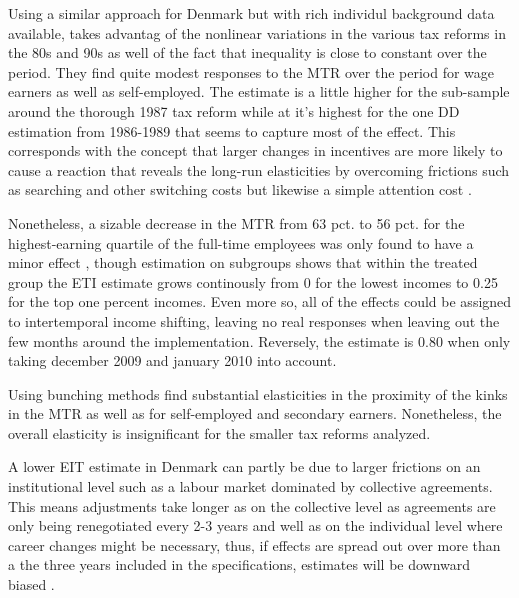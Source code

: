 Using a similar approach for Denmark but with rich individul background data available, \citet{kleven2014estimating} takes advantag of the nonlinear variations in the various tax reforms in the 80s and 90s as well of the fact that inequality is close to constant over the period. They find quite modest responses to the MTR over the period for wage earners as well as self-employed. The estimate is a little higher for the sub-sample around the thorough 1987 tax reform while at it's highest for the one DD estimation from 1986-1989 that seems to capture most of the effect. This corresponds with the concept that larger changes in incentives are more likely to cause a reaction that reveals the long-run elasticities by overcoming frictions such as searching and other switching costs but likewise a simple attention cost \citep{chetty2012bounds}.

Nonetheless, a sizable decrease in the MTR from 63 pct. to 56 pct. for the highest-earning quartile of the full-time employees was only found to have a minor effect \citep{kreiner2016tax}, though estimation on subgroups shows that within the treated group the ETI estimate grows continously from 0 for the lowest incomes to 0.25 for the top one percent incomes. Even more so, all of the effects could be assigned to intertemporal income shifting, leaving no real responses when leaving out the few months around the implementation. Reversely, the estimate is 0.80 when only taking december 2009 and january 2010 into account.

Using bunching methods \citet{chetty2011adjustment} find substantial elasticities in the proximity of the kinks in the MTR as well as for self-employed and secondary earners. Nonetheless, the overall elasticity is insignificant for the smaller tax reforms analyzed.

A lower EIT estimate in Denmark can partly be due to larger frictions on an institutional level such as a labour market dominated by collective agreements. This means adjustments take longer as on the collective level as agreements are only being renegotiated every 2-3 years and well as on the individual level where career changes might be necessary, thus, if effects are spread out over more than a the three years included in the specifications, estimates will be downward biased \citep{chetty2011adjustment}.
